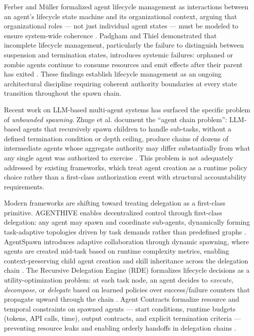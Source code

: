 Ferber and Müller formalized agent lifecycle management as interactions between an agent's lifecycle state machine and its organizational context, arguing that organizational roles — not just individual agent states — must be modeled to ensure system-wide coherence \cite{ferber1996}. Padgham and Thiel demonstrated that incomplete lifecycle management, particularly the failure to distinguish between suspension and termination states, introduces systemic failures: orphaned or zombie agents continue to consume resources and emit effects after their parent has exited \cite{padgham2001}. These findings establish lifecycle management as an ongoing architectural discipline requiring coherent authority boundaries at every state transition throughout the spawn chain.

Recent work on LLM-based multi-agent systems has surfaced the specific problem of \emph{unbounded spawning}. Zhuge et al. document the ``agent chain problem'': LLM-based agents that recursively spawn children to handle sub-tasks, without a defined termination condition or depth ceiling, produce chains of dozens of intermediate agents whose aggregate authority may differ substantially from what any single agent was authorized to exercise \cite{zhuge2024}. This problem is not adequately addressed by existing frameworks, which treat agent creation as a runtime policy choice rather than a first-class authorization event with structural accountability requirements.

Modern frameworks are shifting toward treating delegation as a first-class primitive. AGENTHIVE enables decentralized control through first-class delegation: any agent may spawn and coordinate sub-agents, dynamically forming task-adaptive topologies driven by task demands rather than predefined graphs \cite{agenthive2025}. AgentSpawn introduces adaptive collaboration through dynamic spawning, where agents are created mid-task based on runtime complexity metrics, enabling context-preserving child agent creation and skill inheritance across the delegation chain \cite{agentspawn2026}. The Recursive Delegation Engine (RDE) formalizes lifecycle decisions as a utility-optimization problem: at each task node, an agent decides to \emph{execute}, \emph{decompose}, or \emph{delegate} based on learned policies over success/failure counters that propagate upward through the chain \cite{rde2024}. Agent Contracts formalize resource and temporal constraints on spawned agents — start conditions, runtime budgets (tokens, API calls, time), output contracts, and explicit termination criteria — preventing resource leaks and enabling orderly handoffs in delegation chains \cite{agentcontracts2025}.

